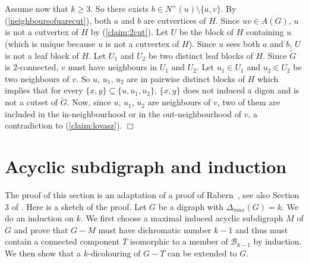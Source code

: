 \documentclass[11pt]{article}
\newcommand{\mc}{\mathcal}
\newcommand{\dmax}{\Delta_{max}}
\newcounter{claim}
\newenvironment{proof}[1][]%
 {\noindent {\setcounter{claim}{0}\sc proof ---
   }{#1}{}}{\hfill$\Box$\vspace{2ex}}
\begin{document}
\begin{proof}
Assume now that $k \geq 3$. So there exists $b \in N^+(u) \setminus \{a,v\}$. By (\ref{neighboursofuarecut}), both $a$ and $b$ are cutvertices of $H$. Since $uv \in A(G)$,  $u$ is not a cutvertex of $H$ by (\ref{claim:2cut}). 
Let $U$ be the block of $H$ containing $u$ (which is unique because $u$ is not a cutvertex of $H$). Since $u$ sees both $a$ and $b$, $U$ is not a leaf block of $H$. 
Let $U_{1}$ and $U_{2}$ be two distinct leaf blocks of $H$. Since $\tilde{G}$ is $2$-connected, $v$ must have neighbours in $U_1$ and $U_2$. Let $u_1 \in U_1$ and $u_2 \in U_2$ be two neighbours of $v$. 
So $u$, $u_1$, $u_2$ are in pairwise distinct blocks of $H$ which implies that for every $\{x,y\} \subseteq \{u,u_1,u_2\}$, $\{x,y\}$ does not induced a digon and is not a cutset of $\tilde{G}$. 
Now, since $u$, $u_1$, $u_2$ are neighbours of $v$, two of them are included in the in-neighbourhood or in the out-neighbourhood of $v$, a contradiction to (\ref{claim:lovasz}).
\end{proof}


\section{Acyclic subdigraph and induction}

The proof of this section is an adaptation of a proof of Rabern~\cite{R14}, see also Section 3 of \cite{CR14}. 
Here is a sketch of the proof. 
Let $G$ be a digraph with $\dmax(G) = k$. We do an induction on $k$. 
We first choose a maximal induced acyclic subdigraph $M$ of $G$ and prove that $G-M$ must have dichromatic number $k-1$ and thus must contain a connected component $T$ isomorphic to a member of $\mc B_{k-1}$ by induction. We then show that a $k$-dicolouring of $G-T$ can be extended to $G$.  
\end{document}
